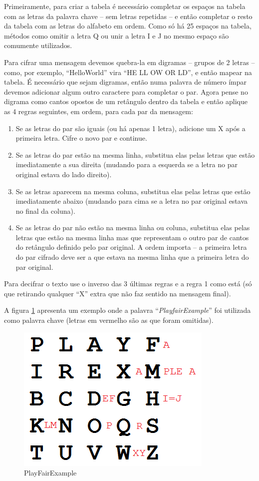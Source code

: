\documentclass[
article,			%
11pt,				%
oneside,			%
a4paper,			%
english,			%
brazil,				%
sumario=tradicional
]{abntex2}
\begin{document}
			Primeiramente, para criar a tabela é necessário completar os espaços na tabela com as letras da palavra chave – sem letras repetidas – e então completar o resto da tabela com as letras do alfabeto em ordem. Como só há 25 espaços na tabela, métodos como omitir a letra Q ou unir a letra I e J no mesmo espaço são comumente utilizados.
			
			Para cifrar uma mensagem devemos quebra-la em digramas – grupos de 2 letras – como, por exemplo, ``HelloWorld'' vira ``HE LL OW OR LD'', e então mapear na tabela. É necessário que sejam digramas, então numa palavra de número ímpar devemos adicionar algum outro caractere para completar o par. Agora pense no digrama como cantos opostos de um retângulo dentro da tabela e então aplique as 4 regras seguintes, em ordem, para cada par da mensagem:
			
			\begin{enumerate}
				\item Se as letras do par são iguais (ou há apenas 1 letra), adicione um X após a primeira letra. Cifre o novo par e continue.
				\item Se as letras do par estão na mesma linha, substitua elas pelas letras que estão imediatamente a sua direita (mudando para a esquerda se a letra no par original estava do lado direito).
				\item Se as letras aparecem na mesma coluna, substitua elas pelas letras que estão imediatamente abaixo (mudando para cima se a letra no par original estava no final da coluna).
				\item Se as letras do par não estão na mesma linha ou coluna, substitua elas pelas letras que estão na mesma linha mas que representam o outro par de cantos do retângulo definido pelo par original. A ordem importa – a primeira letra do par cifrado deve ser a que estava na mesma linha que a primeira letra do par original.
			\end{enumerate}
		
			Para decifrar o texto use o inverso das 3 últimas regras e a regra 1 como está (só que retirando qualquer ``X'' extra que não faz sentido na mensagem final).
			
			
			A figura \ref{fig:playfair} apresenta um exemplo onde a palavra ``\textit{PlayfairExample}'' foi utilizada como palavra chave (letras em vermelho são as que foram omitidas).		
			
			\begin{figure} [!h]
			\centering
			\includegraphics[width=0.5\linewidth]{Imagens/playfair}
			\caption{PlayFairExample}
			\label{fig:playfair}
			\end{figure}
			
\end{document}
